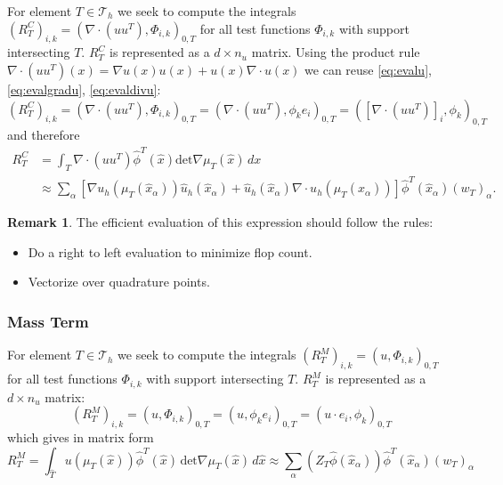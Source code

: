 \documentclass[a4paper,12pt]{article}
\theoremstyle{definition}
\newtheorem{Rem}[Def]{Remark}
\begin{document}
For element $T\in\mathcal{T}_h$ we seek to compute the integrals 
$(R^C_T)_{i,k} = (\nabla\cdot(uu^T),\Phi_{i,k})_{0,T}$ for all test functions $\Phi_{i,k}$
with support intersecting $T$. $R^C_T$ is represented as a $d\times n_u$ matrix.
Using the product rule $\nabla\cdot(uu^T)(x) = \nabla u(x) u(x) + u(x) \nabla\cdot u(x)$ we can reuse \eqref{eq:evalu},  \eqref{eq:evalgradu},
\eqref{eq:evaldivu}:
\begin{equation*}
(R^C_T)_{i,k} = \left(\nabla\cdot(uu^T),\Phi_{i,k}\right)_{0,T} = \left(\nabla\cdot(uu^T),\phi_{k}e_i \right )_{0,T} = 
\left(\left[\nabla\cdot(uu^T)\right]_i,\phi_{k}\right)_{0,T}
\end{equation*}
and therefore
\begin{equation}
\begin{split}
R^C_T &= \int_T \nabla\cdot(uu^T) \hat\phi^T(\hat x) \text{det} \nabla\mu_T(\hat x) \,dx\\
&\approx \sum_\alpha \left[  \nabla u_h(\mu_T(\hat x_\alpha)) \hat u_h(\hat x_\alpha) 
+ \hat u_h(\hat x_\alpha) \nabla\cdot u_h(\mu_T(\hat x_\alpha)) \right] \hat\phi^T(\hat x_\alpha) (w_T)_\alpha.
\end{split}
\end{equation}

\begin{Rem}
The efficient evaluation of this expression should follow the rules:
\begin{itemize}
\item Do a right to left evaluation to minimize flop count.
\item Vectorize over quadrature points.
\end{itemize}
\end{Rem}

\subsubsection*{Mass Term}

For element $T\in\mathcal{T}_h$ we seek to compute the integrals 
$(R^{M}_T)_{i,k} = ( u, \Phi_{i,k})_{0,T}$ for all test functions $\Phi_{i,k}$
with support intersecting $T$. $R^M_T$ is represented as a $d\times n_u$ matrix:
\begin{equation*}
(R^{M}_T)_{i,k} = \left( u,\Phi_{i,k}\right)_{0,T} =  \left( u,\phi_{k} e_i\right)_{0,T} =  \left( u\cdot e_i,\phi_{k}\right)_{0,T}
\end{equation*}
which gives in matrix form
\begin{equation}
R^{M}_T = \int_{\hat T} u(\mu_T(\hat x)) \hat\phi^T(\hat x)  \, \text{det} \nabla\mu_T(\hat x) \,d\hat x
\approx \sum_\alpha (Z_T \hat\phi(\hat x_\alpha)) \hat\phi^T(\hat x_\alpha) (w_T)_\alpha
\end{equation}
\end{document}
